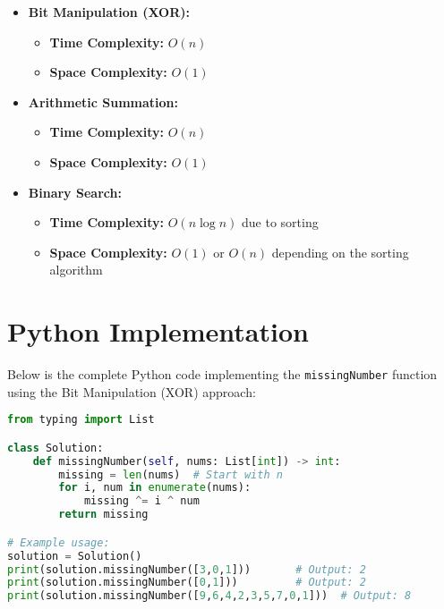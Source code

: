 \begin{itemize}
    \item \textbf{Bit Manipulation (XOR):}
    \begin{itemize}
        \item \textbf{Time Complexity:} \(O(n)\)
        \item \textbf{Space Complexity:} \(O(1)\)
    \end{itemize}
    
    \item \textbf{Arithmetic Summation:}
    \begin{itemize}
        \item \textbf{Time Complexity:} \(O(n)\)
        \item \textbf{Space Complexity:} \(O(1)\)
    \end{itemize}
    
    \item \textbf{Binary Search:}
    \begin{itemize}
        \item \textbf{Time Complexity:} \(O(n \log n)\) due to sorting
        \item \textbf{Space Complexity:} \(O(1)\) or \(O(n)\) depending on the sorting algorithm
    \end{itemize}
\end{itemize}

\section*{Python Implementation}


Below is the complete Python code implementing the \texttt{missingNumber} function using the Bit Manipulation (XOR) approach:

\begin{fullwidth}
\begin{lstlisting}[language=Python]
from typing import List

class Solution:
    def missingNumber(self, nums: List[int]) -> int:
        missing = len(nums)  # Start with n
        for i, num in enumerate(nums):
            missing ^= i ^ num
        return missing

# Example usage:
solution = Solution()
print(solution.missingNumber([3,0,1]))       # Output: 2
print(solution.missingNumber([0,1]))         # Output: 2
print(solution.missingNumber([9,6,4,2,3,5,7,0,1]))  # Output: 8
\end{lstlisting}
\end{fullwidth}

